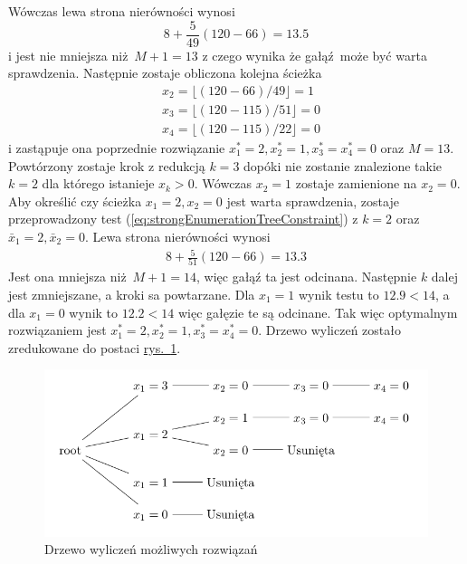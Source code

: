 Wówczas lewa strona nierówności wynosi
\begin{equation*}
  8 + \frac{5}{49}(120-66) = 13.5
\end{equation*}
i jest nie mniejsza niż $M + 1 = 13$ z czego wynika że gałąź może być warta sprawdzenia.
Następnie zostaje obliczona kolejna ścieżka
\begin{equation*}
  \begin{aligned}
    & x_2 = \lfloor(120-66)/49\rfloor = 1 \\
    & x_3 = \lfloor(120-115)/51\rfloor = 0 \\
    & x_4 = \lfloor(120-115)/22\rfloor = 0
  \end{aligned}
\end{equation*}
i zastąpuje ona poprzednie rozwiązanie $x_1^* = 2, x_2^*=1, x_3^*=x_4^*=0$ oraz $M = 13$. Powtórzony zostaje krok z redukcją $k=3$ dopóki nie zostanie znalezione takie $k=2$ dla którego istanieje $x_k>0$. Wówczas $x_2=1$ zostaje zamienione na $x_2=0$. Aby określić czy ścieżka $x_1=2, x_2=0$ jest warta sprawdzenia, zostaje przeprowadzony test (\ref{eq:strongEnumerationTreeConstraint}) z $k=2$ oraz $\bar{x}_1 = 2, \bar{x}_2 = 0$. Lewa strona nierówności wynosi
\begin{equation*}
  \begin{aligned}
    8+\frac{5}{51}(120-66) = 13.3
  \end{aligned}
\end{equation*}
Jest ona mniejsza niż $M+1 =14$, więc gałąź ta jest odcinana. Następnie $k$ dalej jest zmniejszane, a kroki sa powtarzane. Dla $x_1=1$ wynik testu to $12.9 < 14$, a dla $x_1=0$ wynik to $12.2 < 14$ więc gałęzie te są odcinane. Tak więc optymalnym rozwiązaniem jest  $x_1^* = 2, x_2^*=1, x_3^*=x_4^*=0$. Drzewo wyliczeń zostało zredukowane do postaci \hyperref[fig:reducedchvatalBBtree]{rys.~\ref*{fig:reducedchvatalBBtree}}.

\begin{figure}
  \includegraphics[width=\textwidth,center]{../image/reduced_chvatal_book_sample.png}%
  \caption{Drzewo wyliczeń możliwych rozwiązań}
  \label{fig:reducedchvatalBBtree}
\end{figure}

